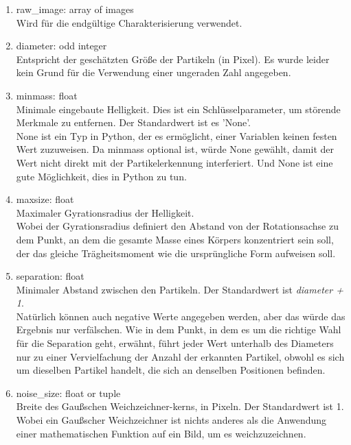 		\begin{enumerate}
    			\item raw\_image: array of images \\
    			Wird für die endgültige Charakterisierung verwendet.
    			
    			\item diameter: odd integer \\
    			Entspricht der geschätzten Größe der Partikeln (in Pixel). Es wurde leider kein Grund für die Verwendung einer ungeraden Zahl angegeben.
    			\item minmass: float \\
    			Minimale eingebaute Helligkeit. Dies ist ein Schlüsselparameter, um störende 				Merkmale zu entfernen. Der Standardwert ist es 'None'.\\
    			\label{none}None ist ein Typ in Python, der es ermöglicht, einer Variablen keinen festen Wert zuzuweisen. Da minmass optional ist, würde None gewählt, damit der Wert nicht direkt mit der Partikelerkennung interferiert. Und None ist eine gute Möglichkeit, dies in Python zu tun.
    			
    			\item maxsize: float\\
    			Maximaler Gyrationsradius der Helligkeit.\\
    			Wobei der Gyrationsradius \cite{raduis_of_gyration} definiert den Abstand von der Rotationsachse zu dem Punkt, an dem die gesamte Masse eines Körpers konzentriert sein soll, der das gleiche Trägheitsmoment wie die ursprüngliche Form aufweisen soll.    			
    			
    			\item separation: float\\
    			Minimaler Abstand zwischen den Partikeln. Der Standardwert ist \textit{diameter + 1}.\\
    			Natürlich können auch negative Werte angegeben werden, aber das würde das Ergebnis nur verfälschen. Wie in dem Punkt, in dem es um die richtige Wahl für die Separation geht, erwähnt, führt jeder Wert unterhalb des Diameters nur zu einer Vervielfachung der Anzahl der erkannten Partikel, obwohl es sich um dieselben Partikel handelt, die sich an denselben Positionen befinden.			
    			
    			\item noise\_size: float or tuple\\
    			Breite des Gaußschen Weichzeichner-kerns, in Pixeln. Der Standardwert ist 1.\\
    			Wobei  ein Gaußscher Weichzeichner ist nichts anderes als die Anwendung einer mathematischen Funktion auf ein Bild, um es weichzuzeichnen.
    			

\end{enumerate}

